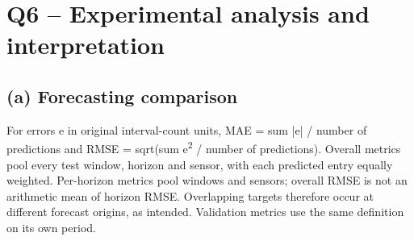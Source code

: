 \documentclass[11pt,a4paper]{article}
\begin{document}
\section{Q6 -- Experimental analysis and interpretation}\subsection{(a) Forecasting comparison}
For errors e in original interval-count units, MAE = sum |e| / number of predictions and RMSE = sqrt(sum e\textsuperscript{2} / number of predictions). Overall metrics pool every test window, horizon and sensor, with each predicted entry equally weighted. Per-horizon metrics pool windows and sensors; overall RMSE is not an arithmetic mean of horizon RMSE. Overlapping targets therefore occur at different forecast origins, as intended. Validation metrics use the same definition on its own period.
\end{document}
